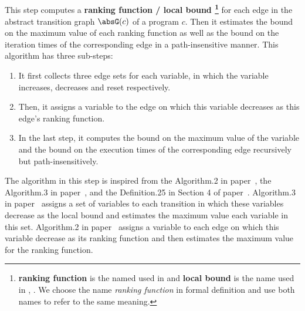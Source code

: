 \subsection{}
\label{sec:lbcompute}
This step computes a 
\textbf{ranking function / local bound 
\footnote{\textbf{ranking function} is the named used in \cite{SinnZV14}
and \textbf{local bound} is the name used in \cite{ZulegerGSV11}, \cite{sinn2017complexity}.
We choose the name \emph{ranking function} in formal definition and use both names to refer to the same meaning.
}}
for each edge in the abstract transition graph $\absG(c)$ of a program $c$.
Then it estimates the bound on the maximum value of each ranking function   as well as
the bound on the iteration times of the corresponding edge in a path-insensitive manner.
This algorithm has three sub-steps:
\begin{enumerate}
  \item It first collects three edge sets for each variable,
in which the variable increases, decreases and reset respectively.
\item
Then, it assigns a variable to the edge on which this variable decreases as this edge's ranking function.
\item
In the last step, it computes the bound on the maximum value of the variable and the bound on the execution
times of the corresponding edge recursively but path-insensitively.
\end{enumerate}
The algorithm in this step is inspired from the Algorithm.2 in paper~\cite{SinnZV14},
the Algorithm.3 in paper~\cite{ZulegerGSV11},
and the Definition.25 in Section 4 of paper~\cite{sinn2017complexity}.
Algorithm.3 in paper~\cite{ZulegerGSV11} assigns a set of variables to each transition in which these variables decrease as the local bound
and estimates the maximum value each variable in this set.
Algorithm.2 in paper~\cite{SinnZV14} assigns a variable to each edge on which this variable decrease as its ranking function
and then estimates the maximum value for the ranking function.
